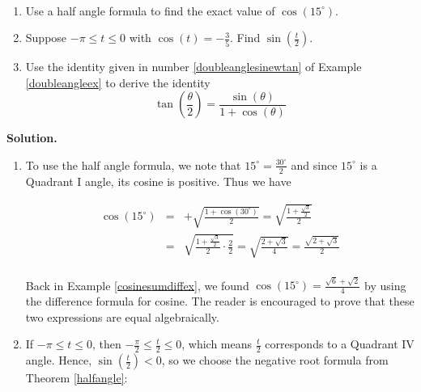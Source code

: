 \documentclass{ximera}
\begin{document}
\begin{example} $~$

\begin{enumerate}

\item  Use a half angle formula to find the exact value of $\cos\left(15^{\circ}\right)$.

\item  Suppose $-\pi \leq t \leq 0$ with $\cos(t) = -\frac{3}{5}$.  Find $\sin\left(\frac{t}{2}\right)$.

\item  Use the identity given in number \ref{doubleanglesinewtan} of Example \ref{doubleangleex} to derive the identity \[\tan\left( \frac{\theta}{2}\right) =  \frac{\sin(\theta)}{1+\cos(\theta)}\]

\end{enumerate}

\newpage

{\bf Solution.}

\begin{enumerate}

\item  To use the half angle formula, we note that $15^{\circ} = \frac{30^{\circ}}{2}$ and since $15^{\circ}$ is a Quadrant I angle, its cosine is positive.  Thus we have

\vspace{-.1in}

\[ \begin{array}{rcl}

\cos\left(15^{\circ}\right) & = &  + \sqrt{ \frac{1+\cos\left(30^{\circ}\right)}{2}} = \sqrt{ \frac{1+\frac{\sqrt{3}}{2}}{2}}\\   
                          	& = & \sqrt{ \frac{1+\frac{\sqrt{3}}{2}}{2}\cdot  \frac{2}{2}} = \sqrt{ \frac{2+\sqrt{3}}{4}} =  \frac{\sqrt{2+\sqrt{3}}}{2}\\
\end{array}\]

Back in Example \ref{cosinesumdiffex}, we found $\cos\left(15^{\circ}\right)  = \frac{\sqrt{6}+ \sqrt{2}}{4}$ by using the difference formula for cosine. The reader is encouraged to prove that these two expressions are equal algebraically.

\item  If $-\pi \leq t \leq 0$, then $-\frac{\pi}{2} \leq \frac{t}{2} \leq 0$, which means $ \frac{t}{2}$ corresponds to a Quadrant IV angle.  Hence,  $\sin\left(\frac{t}{2}\right) < 0$, so we choose the negative root formula from Theorem \ref{halfangle}:


\end{enumerate}
\end{example}
\end{document}
